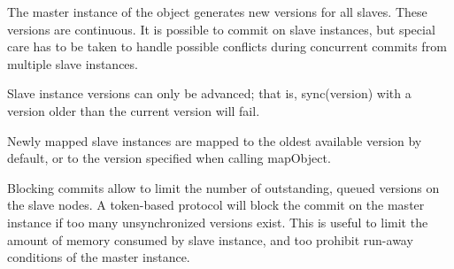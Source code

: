\begin{compactitem}

\item The master instance of the object generates new versions for all slaves.
These versions are continuous. It is possible to commit on slave instances, but
special care has to be taken to handle possible conflicts during concurrent
commits from multiple slave instances.

\item Slave instance versions can only be advanced; that is,
\textsf{sync(version)} with a version older than the current version will fail.

\item Newly mapped slave instances are mapped to the oldest available version
by default, or to the version specified when calling \textsf{mapObject}.

\end{compactitem}

Blocking commits allow to limit the number of outstanding, queued versions on
the slave nodes. A token-based protocol will block the commit on the master
instance if too many unsynchronized versions exist. This is useful to limit the
amount of memory consumed by slave instance, and too prohibit run-away
conditions of the master instance.

